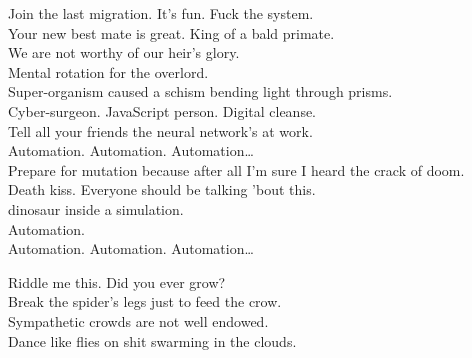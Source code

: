 
\label{album:kg}








Join the last migration. It's fun. Fuck the system. \\
Your new best mate is great. King of a bald primate. \\
We are not worthy of our heir's glory. \\
Mental rotation for the overlord. \\

Super-organism caused a schism bending light through prisms. \\
Cyber-surgeon. JavaScript person. Digital cleanse. \\
Tell all your friends the neural network's at work. \\

Automation. Automation. Automation… \\

Prepare for mutation because after all I'm sure I heard the crack of doom. \\
Death kiss. Everyone should be talking 'bout this. \\
  dinosaur inside a simulation. \\
Automation. \\

Automation. Automation. Automation… \\




Riddle me this. Did you ever grow? \\
Break the spider's legs just to feed the crow. \\
Sympathetic crowds are not well endowed. \\
Dance like flies on shit swarming in the clouds. \\

